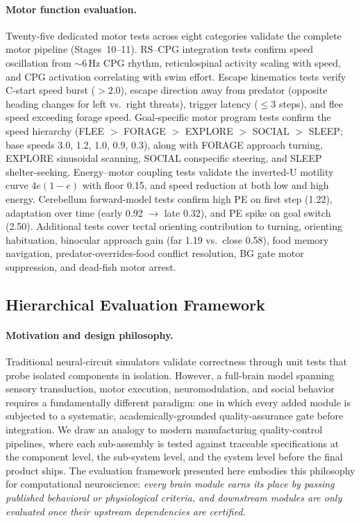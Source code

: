 \documentclass[12pt]{article}
\begin{document}
\paragraph{Motor function evaluation.}
Twenty-five dedicated motor tests across eight categories validate the
complete motor pipeline (Stages~10--11).  RS--CPG integration tests
confirm speed oscillation from ${\sim}6$\,Hz CPG rhythm, reticulospinal
activity scaling with speed, and CPG activation correlating with swim
effort.  Escape kinematics tests verify C-start speed burst ($>2.0$),
escape direction away from predator (opposite heading changes for left
vs.\ right threats), trigger latency ($\le 3$ steps), and flee speed
exceeding forage speed.  Goal-specific motor program tests confirm the speed hierarchy
(FLEE $>$ FORAGE $>$ EXPLORE $>$ SOCIAL $>$ SLEEP;
base speeds 3.0, 1.2, 1.0, 0.9, 0.3), along with
FORAGE approach turning, EXPLORE sinusoidal scanning,
SOCIAL conspecific steering, and SLEEP shelter-seeking.  Energy--motor coupling tests validate the
inverted-U motility curve $4e(1{-}e)$ with floor 0.15, and speed
reduction at both low and high energy.  Cerebellum forward-model tests
confirm high PE on first step (1.22), adaptation over time (early 0.92
$\to$ late 0.32), and PE spike on goal switch (2.50).  Additional tests
cover tectal orienting contribution to turning, orienting habituation,
binocular approach gain (far 1.19 vs.\ close 0.58), food memory
navigation, predator-overrides-food conflict resolution, BG gate motor
suppression, and dead-fish motor arrest.

\subsection{Hierarchical Evaluation Framework}\label{sec:eval_platform}

\paragraph{Motivation and design philosophy.}
Traditional neural-circuit simulators validate correctness through unit tests
that probe isolated components in isolation.
However, a full-brain model spanning sensory transduction, motor execution,
neuromodulation, and social behavior requires a fundamentally different
paradigm: one in which every added module is subjected to a systematic,
academically-grounded quality-assurance gate before integration.
We draw an analogy to modern manufacturing quality-control pipelines,
where each sub-assembly is tested against traceable specifications at the
component level, the sub-system level, and the system level before the
final product ships.
The evaluation framework presented here embodies this philosophy for
computational neuroscience: \emph{every brain module earns its place by
passing published behavioral or physiological criteria, and downstream
modules are only evaluated once their upstream dependencies are certified}.
\end{document}
